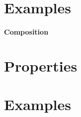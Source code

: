 \documentclass[11pt]{article}
\theoremstyle{plain}
\begin{document}

\section{Examples}

\paragraph{Composition}




\section{Properties}

\section{Examples}



\end{document}
